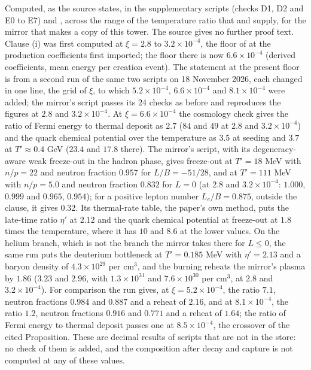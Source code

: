 Computed, as the source states, in the supplementary scripts  (checks D1, D2 and E0 to E7) and , across the range of the temperature ratio that  and  supply, for the mirror that  makes a copy of this tower. The source gives no further proof text. Clause (i) was first computed at $\xi = 2.8$ to $3.2 \times 10^{-4}$, the floor of  at the production coefficients first imported; the floor there is now $6.6 \times 10^{-4}$ (derived coefficients, mean energy per creation event). The statement at the present floor is from a second run of the same two scripts on 18 November 2026, each changed in one line, the grid of $\xi$, to which $5.2 \times 10^{-4}$, $6.6 \times 10^{-4}$ and $8.1 \times 10^{-4}$ were added; the mirror's script passes its $24$ checks as before and reproduces the figures at $2.8$ and $3.2 \times 10^{-4}$. At $\xi = 6.6 \times 10^{-4}$ the cosmology check gives the ratio of Fermi energy to thermal deposit as $2.7$ ($84$ and $49$ at $2.8$ and $3.2 \times 10^{-4}$) and the quark chemical potential over the temperature as $3.5$ at seeding and $3.7$ at $T' \approx 0.4$ GeV ($23.4$ and $17.8$ there). The mirror's script, with its degeneracy-aware weak freeze-out in the hadron phase, gives freeze-out at $T' = 18$ MeV with $n/p = 22$ and neutron fraction $0.957$ for $L/B = -51/28$, and at $T' = 111$ MeV with $n/p = 5.0$ and neutron fraction $0.832$ for $L = 0$ (at $2.8$ and $3.2 \times 10^{-4}$: $1.000$, $0.999$ and $0.965$, $0.954$); for a positive lepton number $L_{e}/B = 0.875$, outside the clause, it gives $0.32$. Its thermal-rate table, the paper's own method, puts the late-time ratio $\eta'$ at $2.12$ and the quark chemical potential at freeze-out at $1.8$ times the temperature, where it has $10$ and $8.6$ at the lower values. On the helium branch, which is not the branch the mirror takes there for $L \leq 0$, the same run puts the deuterium bottleneck at $T' = 0.185$ MeV with $\eta' = 2.13$ and a baryon density of $4.3 \times 10^{29}$ per cm$^{3}$, and the burning reheats the mirror's plasma by $1.86$ ($3.23$ and $2.96$, with $1.3 \times 10^{31}$ and $7.6 \times 10^{30}$ per cm$^{3}$, at $2.8$ and $3.2 \times 10^{-4}$). For comparison the run gives, at $\xi = 5.2 \times 10^{-4}$, the ratio $7.1$, neutron fractions $0.984$ and $0.887$ and a reheat of $2.16$, and at $8.1 \times 10^{-4}$, the ratio $1.2$, neutron fractions $0.916$ and $0.771$ and a reheat of $1.64$; the ratio of Fermi energy to thermal deposit passes one at $8.5 \times 10^{-4}$, the crossover of the cited Proposition. These are decimal results of scripts that are not in the store: no check of them is added, and the composition after decay and capture is not computed at any of these values.
